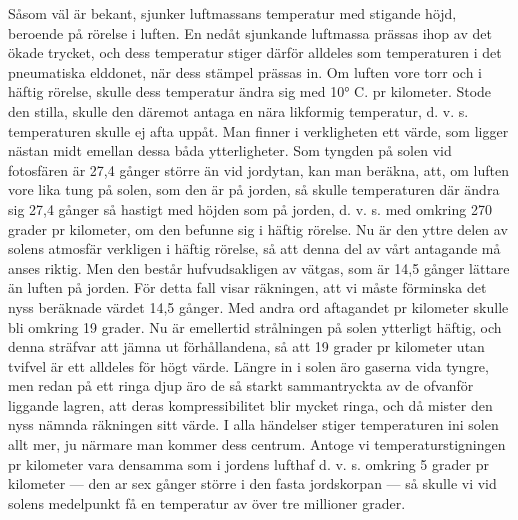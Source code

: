 \documentclass[a4paper, 12pt, oneside, swedish]{article}
\begin{document}
Såsom väl är bekant, sjunker luftmassans temperatur med stigande höjd, beroende på rörelse i luften. En nedåt sjunkande luftmassa prässas ihop av det ökade trycket, och dess temperatur stiger därför alldeles som temperaturen i det pneumatiska elddonet, när dess stämpel prässas in. Om luften vore torr och i häftig rörelse, skulle dess temperatur ändra sig med 10° C. pr kilometer. Stode den stilla, skulle den däremot antaga en nära likformig temperatur, d. v. s. temperaturen skulle ej afta uppåt. Man finner i verkligheten ett värde, som ligger nästan midt emellan dessa båda ytterligheter. Som tyngden på solen vid fotosfären är 27,4 gånger större än vid jordytan, kan man beräkna, att, om luften vore lika tung på solen, som den är på jorden, så skulle temperaturen där ändra sig 27,4 gånger så hastigt med höjden som på jorden, d. v. s. med omkring 270 grader pr kilometer, om den befunne sig i häftig rörelse. Nu är den yttre delen av solens atmosfär verkligen i häftig rörelse, så att denna del av vårt antagande må anses riktig. Men den består hufvudsakligen av vätgas, som är 14,5 gånger lättare än luften på jorden. För detta fall visar räkningen, att vi måste förminska det nyss beräknade värdet 14,5 gånger. Med andra ord aftagandet pr kilometer skulle bli omkring 19 grader. Nu är emellertid strålningen på solen ytterligt häftig, och denna sträfvar att jämna ut förhållandena, så att 19 grader pr kilometer utan tvifvel är ett alldeles för högt värde. Längre in i solen äro gaserna vida tyngre, men redan på ett ringa djup äro de så starkt sammantryckta av de ofvanför liggande lagren, att deras kompressibilitet blir mycket ringa, och då mister den nyss nämnda räkningen sitt värde. I alla händelser stiger temperaturen ini solen allt mer, ju närmare man kommer dess centrum. Antoge vi temperaturstigningen pr kilometer vara densamma som i jordens lufthaf d. v. s. omkring 5 grader pr kilometer --- den ar sex gånger större i den fasta jordskorpan --- så skulle vi vid solens medelpunkt få en temperatur av över tre millioner grader.
\end{document}
